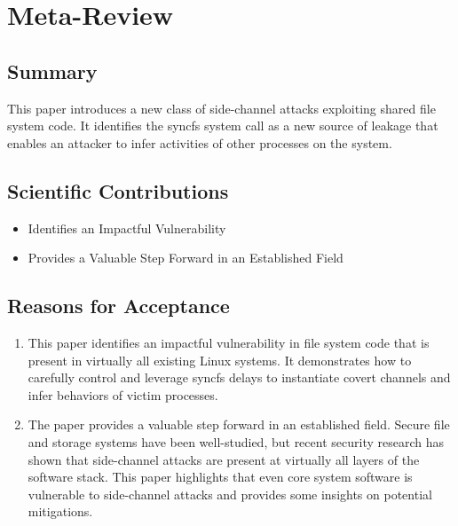 \newpage %

\appendices %

\section{Meta-Review}

\subsection{Summary}
This paper introduces a new class of side-channel attacks exploiting shared file system code. It identifies the syncfs system call as a new source of leakage that enables an attacker to infer activities of other processes on the system.


\subsection{Scientific Contributions}

\begin{itemize}
\item Identifies an Impactful Vulnerability
\item Provides a Valuable Step Forward in an Established Field
\end{itemize}

\subsection{Reasons for Acceptance}
\begin{enumerate}
\item This paper identifies an impactful vulnerability in file system code that is present in virtually all existing Linux systems. It demonstrates how to carefully control and leverage syncfs delays to instantiate covert channels and infer behaviors of victim processes.
\item The paper provides a valuable step forward in an established field. Secure file and storage systems have been well-studied, but recent security research has shown that side-channel attacks are present at virtually all layers of the software stack. This paper highlights that even core system software is vulnerable to side-channel attacks and provides some insights on potential mitigations.
\end{enumerate}

